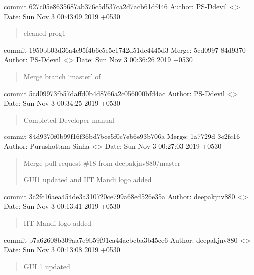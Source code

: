 \documentclass[letterpaper,10pt,english]{sphinxmanual}
\begin{document}
commit 627c05e8635687ab376c5d537ca2d7acb61df446
Author: PS-Ddevil \textless{}\textgreater{}
Date:   Sun Nov 3 00:43:09 2019 +0530
\begin{quote}

cleaned prog1
\end{quote}

commit 1950bb03d36a4e95f4b6e5e5c1742d51dc4445d3
Merge: 5cd0997 84d9370
Author: PS-Ddevil \textless{}\textgreater{}
Date:   Sun Nov 3 00:36:26 2019 +0530
\begin{quote}

Merge branch ‘master’ of 
\end{quote}

commit 5cd09973fb57daffd0b4d8766a2c056000bfd4ac
Author: PS-Ddevil \textless{}\textgreater{}
Date:   Sun Nov 3 00:34:25 2019 +0530
\begin{quote}

Completed Developer manual
\end{quote}

commit 84d9370f0b99f16f36bd7bce5f0c7eb6e93b706a
Merge: 1a7729d 3c2fc16
Author: Purushottam Sinha \textless{}\textgreater{}
Date:   Sun Nov 3 00:27:03 2019 +0530
\begin{quote}

Merge pull request \#18 from deepakjnv880/master

GUI1 updated and IIT Mandi logo added
\end{quote}

commit 3c2fc16aea454de3a310720ce799a68ed526e35a
Author: deepakjnv880 \textless{}\textgreater{}
Date:   Sun Nov 3 00:13:41 2019 +0530
\begin{quote}

IIT Mandi logo added
\end{quote}

commit b7a62608b309aa7e9b59f91ca44acbcba3b45ce6
Author: deepakjnv880 \textless{}\textgreater{}
Date:   Sun Nov 3 00:13:08 2019 +0530
\begin{quote}

GUI 1 updated
\end{quote}
\end{document}

